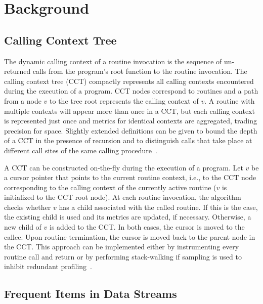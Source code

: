 \documentclass[preprint]{sigplanconf}
\begin{document}
\section{Background}
\label{se:background}

\subsection{Calling Context Tree}
\label{ss:callingContextTree}

The dynamic calling context of a routine invocation is the sequence of un-returned calls from the program's root
function to the routine invocation. The calling context tree (CCT) compactly represents all calling contexts encountered during the execution of a program. CCT nodes correspond to routines and a path from a node $v$ to the tree root represents the calling context of $v$. A routine with multiple contexts will appear more than once in a CCT, but each calling context is represented just once and metrics for identical contexts are aggregated, trading precision for space. Slightly extended definitions can be given to bound the depth of a CCT in the presence of recursion and to distinguish calls that take place at different call sites of the same calling procedure~\cite{ABL97}.

A CCT can be constructed on-the-fly during the execution of a program. Let $v$ be a cursor pointer that points to
the current routine context, i.e., to the  CCT node corresponding to the calling context of the currently active routine ($v$ is initialized to the CCT root node). At each routine invocation, the algorithm checks whether $v$ has a child associated with the called routine. If this is the case, the existing child is used and its metrics are updated, if necessary. Otherwise, a new child of $v$ is added to the CCT.  In both cases, the cursor is moved to the callee. Upon routine termination, the cursor is moved back to the parent node in the CCT. 
This approach can be implemented either by instrumenting every routine call and return or by performing stack-walking if sampling is used to inhibit redundant profiling~\cite{AS00, W00, ZSCC06}.

\subsection{Frequent Items in Data Streams}
\label{ss:frequent}
\end{document}
